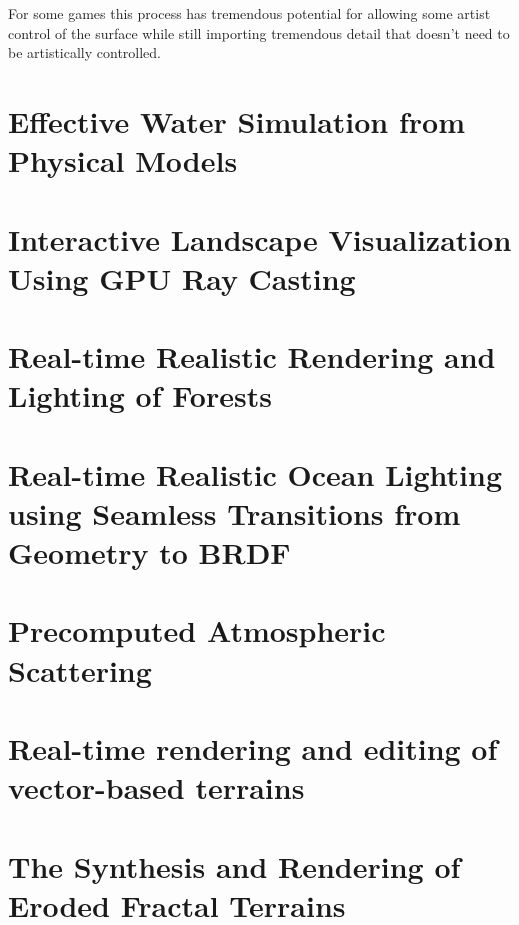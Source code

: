 For some games this process has tremendous potential for allowing some artist control of the surface while still importing tremendous detail that doesn't need to be artistically controlled.


\section{Effective Water Simulation from Physical Models}


\section{Interactive Landscape Visualization Using GPU Ray Casting}


\section{Real-time Realistic Rendering and Lighting of Forests}


\section{Real-time Realistic Ocean Lighting using Seamless Transitions from Geometry to BRDF}


\section{Precomputed Atmospheric Scattering}


\section{Real-time rendering and editing of vector-based terrains}


\section{The Synthesis and Rendering of Eroded Fractal Terrains}


